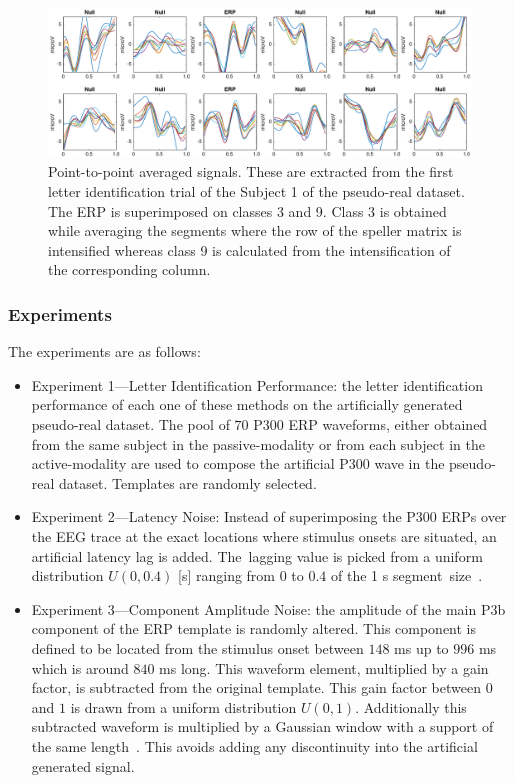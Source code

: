 \documentclass[brainsci,article,accept,moreauthors,pdftex,10pt,a4paper]{mdpi}
\begin{document}
\begin{figure}[H]
\centering
\includegraphics[width=1.0\linewidth]{images/GainCheck.eps}
\caption{Point-to-point averaged signals.  These are extracted from the first letter identification trial of the Subject 1 of the pseudo-real dataset.  The ERP is superimposed on classes 3 and 9.  Class 3 is obtained while averaging the segments where the row of the speller matrix is intensified whereas class 9 is calculated from the intensification of the corresponding column.}
\label{fig:gaincheck}
\end{figure}

\subsubsection{Experiments}
The experiments are as follows:

\begin{itemize}[leftmargin=*,labelsep=5.8mm]
\item Experiment 1---Letter Identification Performance: the letter identification performance of each one of these methods on the artificially generated pseudo-real dataset.  The pool of $70$ P300 ERP waveforms, either obtained from the same subject in the passive-modality or from each subject in the active-modality are used to compose the artificial P300 wave in the pseudo-real dataset.  Templates are randomly selected.
\item Experiment 2---Latency Noise:  Instead of superimposing the P300 ERPs over the EEG trace at the exact locations where stimulus onsets are situated, an artificial latency lag is added.  The~lagging value is picked from a uniform distribution $U(0,0.4)$ [s] ranging from $0$ to $0.4$ of the 1 s segment~size~\citep{DaPelo2018}.
\item Experiment 3---Component Amplitude Noise: the amplitude of the main P3b component of the ERP template is randomly altered.  This component is defined to be located from the stimulus onset between $148$ ms up to $996$ ms which is around $840$ ms long.  This waveform element, multiplied by a gain factor, is subtracted from the original template.  This gain factor between $0$ and $1$ is drawn from a uniform distribution $U(0,1)$.  Additionally this subtracted waveform is multiplied by a Gaussian window with a support of the same length~\citep{Harris1978}.  This avoids adding any discontinuity into the artificial generated signal.
\end{itemize}
\end{document}
